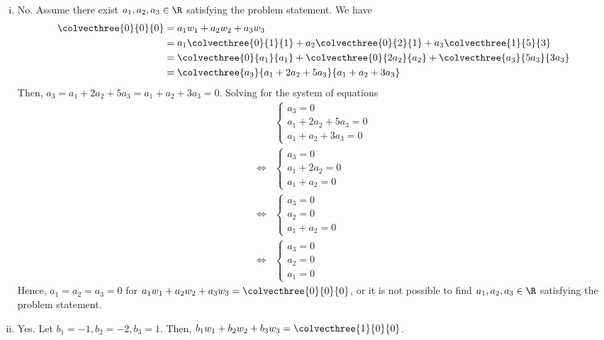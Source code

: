 \newpage
\begin{sol}
    \begin{enumerate}[(i)]
        \item No. Assume there exist $a_1,a_2,a_3\in\R$ satisfying the problem statement. We have
        \[
            \begin{aligned}
                \colvecthree{0}{0}{0} &= a_1w_1+a_2w_2+a_3w_3\\
                                      &= a_1\colvecthree{0}{1}{1}+a_2 \colvecthree{0}{2}{1}+ a_3 \colvecthree{1}{5}{3}\\
                                      &= \colvecthree{0}{a_1}{a_1}+\colvecthree{0}{2a_2}{a_2}+\colvecthree{a_3}{5a_3}{3a_3}\\
                                      &= \colvecthree{a_3}{a_1+2a_2+5a_3}{a_1+a_2+3a_3} 
            \end{aligned}
        \]
        Then, $a_3=a_1+2a_2+5a_3=a_1+a_2+3a_3=0$. Solving for the system of equations 
        \begin{align*}
            &\begin{cases}
                a_3=0\\
                a_1+2a_2+5a_3=0\\
                a_1+a_2+3a_3=0
            \end{cases}\\\iff
            &\begin{cases}
                a_3=0\\
                a_1+2a_2=0\\
                a_1+a_2=0
            \end{cases}\\\iff
            &\begin{cases}
                a_3=0\\
                a_2=0\\
                a_1+a_2=0
            \end{cases}\\\iff
            &\begin{cases}
                a_3=0\\
                a_2=0\\
                a_1=0
            \end{cases}
        \end{align*}
        Hence, $a_1=a_2=a_3=0$ for $a_1w_1+a_2w_2+a_3w_3=\colvecthree{0}{0}{0}$, or it is not possible to find $a_1,a_2,a_3\in\R$ satisfying the problem statement.
        \item Yes. Let $b_1=-1,b_2=-2,b_3=1$. Then, $b_1w_1+b_2w_2+b_3w_3=\colvecthree{1}{0}{0}$.
    \end{enumerate}
\end{sol}
